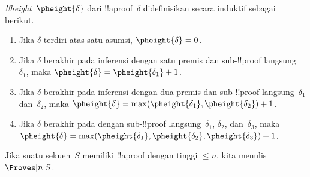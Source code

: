 \documentclass[../../../include/open-logic-section]{subfiles}
\begin{document}


\begin{defn}
\emph{!!{height}}~$\pheight{\delta}$ dari !!a{proof}~$\delta$
didefinisikan secara induktif sebagai berikut.
\begin{enumerate}
  \item Jika $\delta$ terdiri atas satu asumsi,
  $\pheight{\delta}=0$.
  \item Jika $\delta$ berakhir pada inferensi dengan satu premis dan
  sub-!!{proof} langsung~$\delta_1$, maka
  $\pheight{\delta}=\pheight{\delta_1}+1$.
  \item Jika $\delta$ berakhir pada inferensi dengan dua premis dan
  sub-!!{proof} langsung~$\delta_1$ dan~$\delta_2$, maka
  $\pheight{\delta}=
  \max(\pheight{\delta_1},\pheight{\delta_2})+1$.
  \item Jika $\delta$ berakhir pada \Elim{\lor} dengan
  sub-!!{proof} langsung~$\delta_1$, $\delta_2$, dan~$\delta_3$, maka
  $\pheight{\delta}=
  \max(\pheight{\delta_1},\pheight{\delta_2},\pheight{\delta_3})+1$.
\end{enumerate}
Jika suatu sekuen~$S$ memiliki !!a{proof} dengan tinggi $\le n$, kita
menulis $\Proves[n] S$.
\end{defn}
\end{document}
